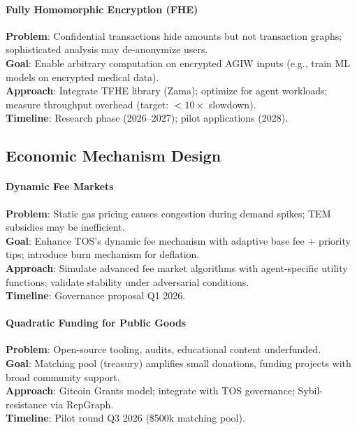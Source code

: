 \documentclass[11pt]{article}
\begin{document}
\paragraph{Fully Homomorphic Encryption (FHE)}
\textbf{Problem}: Confidential transactions hide amounts but not transaction graphs; sophisticated analysis may de-anonymize users.\\
\textbf{Goal}: Enable arbitrary computation on encrypted AGIW inputs (e.g., train ML models on encrypted medical data).\\
\textbf{Approach}: Integrate TFHE library (Zama); optimize for agent workloads; measure throughput overhead (target: $<10\times$ slowdown).\\
\textbf{Timeline}: Research phase (2026--2027); pilot applications (2028).

\subsection{Economic Mechanism Design}

\paragraph{Dynamic Fee Markets}
\textbf{Problem}: Static gas pricing causes congestion during demand spikes; TEM subsidies may be inefficient.\\
\textbf{Goal}: Enhance TOS's dynamic fee mechanism with adaptive base fee + priority tips; introduce burn mechanism for deflation.\\
\textbf{Approach}: Simulate advanced fee market algorithms with agent-specific utility functions; validate stability under adversarial conditions.\\
\textbf{Timeline}: Governance proposal Q1 2026.

\paragraph{Quadratic Funding for Public Goods}
\textbf{Problem}: Open-source tooling, audits, educational content underfunded.\\
\textbf{Goal}: Matching pool (treasury) amplifies small donations, funding projects with broad community support.\\
\textbf{Approach}: Gitcoin Grants model; integrate with TOS governance; Sybil-resistance via RepGraph.\\
\textbf{Timeline}: Pilot round Q3 2026 (\$500k matching pool).
\end{document}
